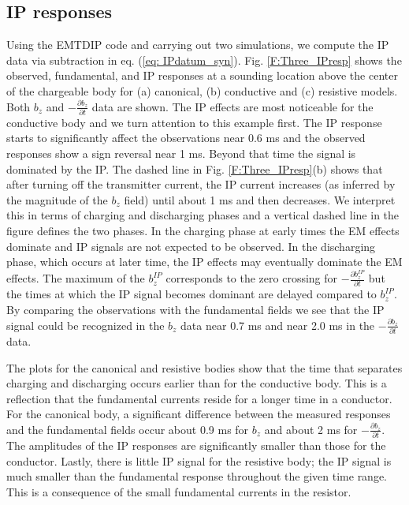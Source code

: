 \documentclass[extra,mreferee]{gji}
\begin{document}
\subsection{IP responses}
Using the  EMTDIP code and carrying out two simulations, we compute the IP data via subtraction in eq. (\ref{eq: IPdatum_syn}).
Fig. \ref{F:Three_IPresp} shows the observed, fundamental, and IP responses at a sounding location above the center of the chargeable body for (a) canonical, (b) conductive and (c) resistive models. Both $b_z$ and $-\frac{\partial b_z}{\partial t}$ data are shown. 
The IP effects are most noticeable for the conductive body and we turn attention to this example first. The IP response starts to significantly affect the observations near 0.6 ms and the observed responses show a sign reversal near 1 ms. Beyond that time the signal is dominated by the IP. The dashed line in Fig. \ref{F:Three_IPresp}(b) shows that after turning off the transmitter current, the IP current increases (as inferred by the magnitude of the $b_z$ field) until about 1 ms and then decreases. We interpret this in terms of charging and discharging phases and a vertical dashed line in the figure defines the two phases. In the charging phase at early times the EM effects dominate and IP signals are not expected to be observed. In the discharging phase, which occurs at  later time, the IP effects may eventually dominate the EM effects. The maximum of the $b_z^{IP}$ corresponds to the zero crossing for $-\frac{\partial b_z^{IP}}{\partial t}$ but the times at which the IP signal becomes dominant are delayed compared to $b_z^{IP}$. By comparing the observations with the fundamental fields we see that the IP signal could be recognized in the $b_z$ data near 0.7 ms and near 2.0 ms in the $-\frac{\partial b_z}{\partial t}$ data.

The plots for the canonical and resistive bodies show that the time that separates charging and discharging occurs earlier than for the conductive body. This is a reflection that the fundamental currents reside for a longer time in a conductor. For the canonical body, a significant difference between the measured responses and the fundamental fields occur about 0.9 ms for $b_z$ and about 2 ms for $-\frac{\partial b_z}{\partial t}$. The amplitudes of the IP responses are significantly smaller than those for the conductor.  Lastly, there is little IP signal for the resistive body; the IP signal is much smaller than the fundamental response throughout the given time range. This is a consequence of the small fundamental currents in the resistor. 
\end{document}
